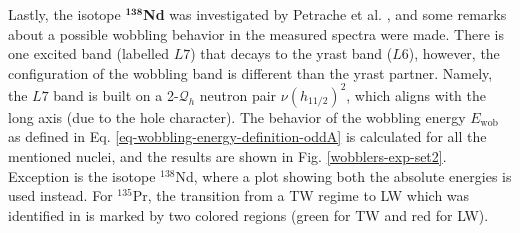 Lastly, the isotope $^\mathbf{138}$\textbf{Nd} was investigated by Petrache et al. \cite{petrache2012tilted}, and some remarks about a possible wobbling behavior in the measured spectra were made. There is one excited band (labelled $L7$) that decays to the yrast band ($L6$), however, the configuration of the wobbling band is different than the yrast partner. Namely, the $L7$ band is built on a 2-$\mathcal{Q}_h$ neutron pair $\nu (h_{11/2})^2$, which aligns with the long axis (due to the hole character). %
The behavior of the wobbling energy $E_\text{wob}$ as defined in Eq. \ref{eq-wobbling-energy-definition-oddA} is calculated for all the mentioned nuclei, and the results are shown in Fig. \ref{wobblers-exp-set2}. Exception is the isotope $^{138}$Nd, where a plot showing both the absolute energies is used instead. For $^{135}$Pr, the transition from a TW regime to LW which was identified in \cite{sensharma2019two} is marked by two colored regions (green for TW and red for LW).
